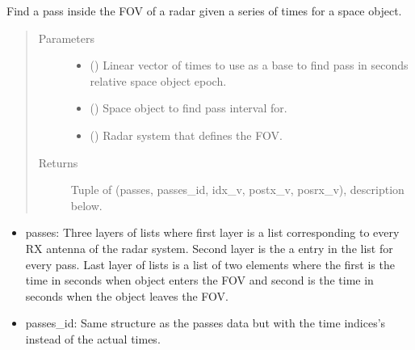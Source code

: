 \documentclass[letterpaper,10pt,english]{sphinxmanual}
\begin{document}
\begin{fulllineitems}
\label{\detokenize{modules/simulate_tracking:simulate_tracking.find_pass_interval}}
Find a pass inside the FOV of a radar given a series of times for a space object.
\begin{quote}\begin{description}
\item[{Parameters}] \leavevmode\begin{itemize}
\item {} 
 () \textendash{} Linear vector of times to use as a base to find pass in seconds relative space object epoch.

\item {} 
 ({\hyperref[\detokenize{modules/space_object:space_object.SpaceObject}]{}}) \textendash{} Space object to find pass interval for.

\item {} 
 ({\hyperref[\detokenize{modules/radar_config:radar_config.RadarSystem}]{}}) \textendash{} Radar system that defines the FOV.

\end{itemize}

\item[{Returns}] \leavevmode
Tuple of (passes, passes\_id, idx\_v, postx\_v, posrx\_v), description below.

\end{description}\end{quote}

\begin{itemize}
\item {} 
passes: Three layers of lists where first layer is a list corresponding to every RX antenna of the radar system. Second layer is the a entry in the list for every pass. Last layer of lists is a list of two elements where the first is the time in seconds when object enters the FOV and second is the time in seconds when the object leaves the FOV.

\item {} 
passes\_id: Same structure as the passes data but with the time indices’s instead of the actual times.


\end{itemize}
\end{fulllineitems}
\end{document}
